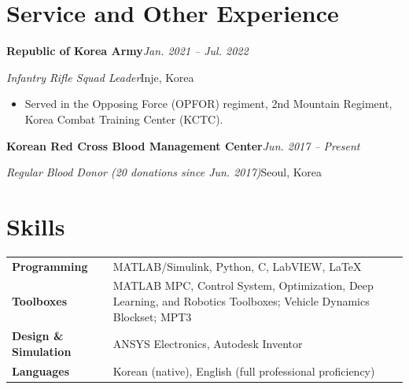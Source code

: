 \documentclass[10pt,letterpaper]{article}
\newcommand{\entry}[4]{\textbf{#1}\hfill\textit{#2}\par\nopagebreak\textit{#3}\hfill{#4}\par\nopagebreak}
\newcommand{\entrygap}{\vspace{3pt}}
\begin{document}
\section{Service and Other Experience}
\entry{Republic of Korea Army}{Jan. 2021 -- Jul. 2022}{Infantry Rifle Squad Leader}{Inje, Korea}
\begin{itemize}
  \item Served in the Opposing Force (OPFOR) regiment, 2nd Mountain Regiment, Korea Combat Training Center (KCTC).
\end{itemize}
\entrygap
\entry{Korean Red Cross Blood Management Center}{Jun. 2017 -- Present}{Regular Blood Donor (20 donations since Jun. 2017)}{Seoul, Korea}

\section{Skills}
\begin{tabularx}{\textwidth}{@{}l X@{}}
  \textbf{Programming} & MATLAB/Simulink, Python, C, LabVIEW, \LaTeX \\
  \textbf{Toolboxes} & MATLAB MPC, Control System, Optimization, Deep Learning, and Robotics Toolboxes; Vehicle Dynamics Blockset; MPT3 \\
  \textbf{Design \& Simulation} & ANSYS Electronics, Autodesk Inventor \\
  \textbf{Languages} & Korean (native), English (full professional proficiency) \\
\end{tabularx}
\end{document}
